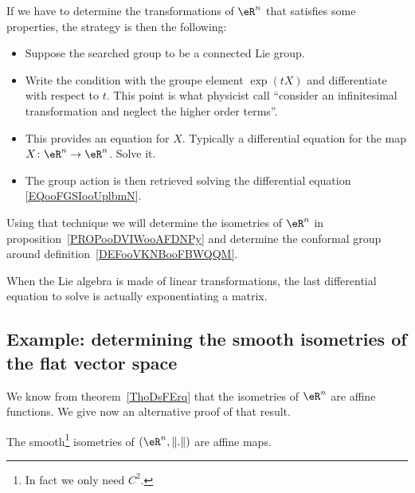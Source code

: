 \begin{normaltext}      \label{NORMooMGAUooIoLtjW}
    If we have to determine the transformations of \( \eR^n\) that satisfies some properties, the strategy is then the following:
    \begin{itemize}
        \item Suppose the searched group to be a connected Lie group.
        \item Write the condition with the groupe element \( \exp(tX)\) and differentiate with respect to \( t\). This point is what physicist call ``consider an infinitesimal transformation and neglect the higher order terms''.
        \item This provides an equation for \( X\). Typically a differential equation for the map \( X\colon \eR^n\to \eR^n\). Solve it.
        \item The group action is then retrieved solving the differential equation \eqref{EQooFGSIooUplbmN}.
    \end{itemize}
    Using that technique we will determine the isometries of \( \eR^n\) in proposition~\ref{PROPooDVIWooAFDNPy} and determine the conformal group around definition~\ref{DEFooVKNBooFBWQQM}.  %
\end{normaltext}

\begin{remark}
    When the Lie algebra is made of linear transformations, the last differential equation to solve is actually exponentiating a matrix.
\end{remark}

\subsection{Example: determining the smooth isometries of the flat vector space}

We know from theorem~\ref{ThoDsFErq} that the isometries of \( \eR^n\) are affine functions. We give now an alternative proof of that result.

\begin{proposition}     \label{PROPooDVIWooAFDNPy}
    The smooth\footnote{In fact we only need \( C^2\).} isometries of \( (\eR^n,\| . \|)  \)  are affine maps.
\end{proposition}

